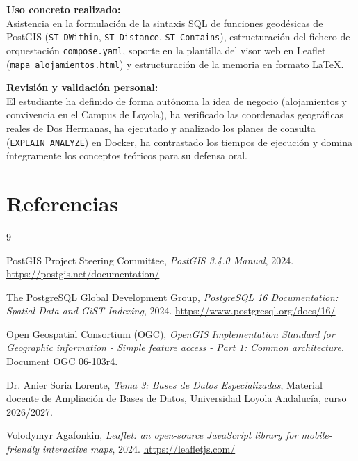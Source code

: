 \documentclass[a4paper,12pt]{article}
\begin{document}
\textbf{Uso concreto realizado:} \\
Asistencia en la formulación de la sintaxis SQL de funciones geodésicas de PostGIS (\texttt{ST\_DWithin}, \texttt{ST\_Distance}, \texttt{ST\_Contains}), estructuración del fichero de orquestación \texttt{compose.yaml}, soporte en la plantilla del visor web en Leaflet (\texttt{mapa\_alojamientos.html}) y estructuración de la memoria en formato \LaTeX{}.

\textbf{Revisión y validación personal:} \\
El estudiante ha definido de forma autónoma la idea de negocio (alojamientos y convivencia en el Campus de Loyola), ha verificado las coordenadas geográficas reales de Dos Hermanas, ha ejecutado y analizado los planes de consulta (\texttt{EXPLAIN ANALYZE}) en Docker, ha contrastado los tiempos de ejecución y domina íntegramente los conceptos teóricos para su defensa oral.

\section{Referencias}

\begin{thebibliography}{9}

PostGIS Project Steering Committee,
\textit{PostGIS 3.4.0 Manual},
2024.
\url{https://postgis.net/documentation/}

The PostgreSQL Global Development Group,
\textit{PostgreSQL 16 Documentation: Spatial Data and GiST Indexing},
2024.
\url{https://www.postgresql.org/docs/16/}

Open Geospatial Consortium (OGC),
\textit{OpenGIS Implementation Standard for Geographic information - Simple feature access - Part 1: Common architecture},
Document OGC 06-103r4.

Dr. Anier Soria Lorente,
\textit{Tema 3: Bases de Datos Especializadas},
Material docente de Ampliación de Bases de Datos, Universidad Loyola Andalucía, curso 2026/2027.

Volodymyr Agafonkin,
\textit{Leaflet: an open-source JavaScript library for mobile-friendly interactive maps},
2024.
\url{https://leafletjs.com/}

\end{thebibliography}
\end{document}

